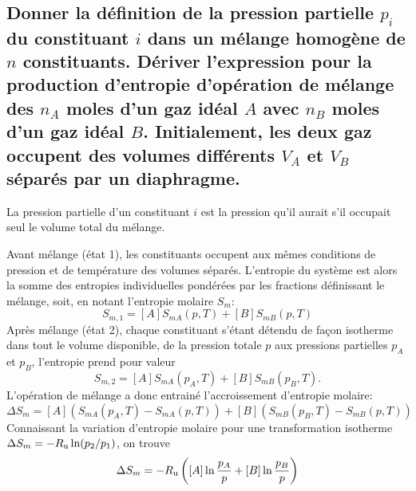 \subsection{Donner la définition de la pression partielle $p_i$ du constituant $i$
dans un mélange homogène de $n$ constituants.
Dériver l'expression pour la production d'entropie d'opération de mélange des
$n_A$ moles d'un gaz idéal $A$ avec $n_B$ moles d'un gaz idéal $B$.
Initialement, les deux gaz occupent des volumes différents $V_A$ et $V_B$
séparés par un diaphragme.}
La pression partielle d'un constituant $i$ est la pression qu'il aurait s'il occupait seul le volume total du mélange.

Avant mélange (état 1), les constituants occupent aux mêmes conditions de pression
et de température des volumes séparés.
L'entropie du système est alors la somme des entropies individuelles pondérées par les fractions
définissant le mélange, soit, en notant l'entropie molaire $S_m$:
\[ S_{m,1} = [A] S_{mA}(p,T) + [B] S_{mB}(p,T) \]
Après mélange (état 2), chaque constituant s'étant détendu de façon isotherme dans tout
le volume disponible, de la pression totale $p$ aux pressions partielles $p_A$ et $p_B$,
l'entropie prend pour valeur
\[ S_{m,2} = [A] S_{mA}(p_A,T) + [B] S_{mB}(p_B,T). \]
L'opération de mélange a donc entrainé l'accroissement d'entropie molaire:
\[ \Delta S_m = [A] \left(S_{mA}(p_A,T) - S_{mA}(p,T)\right) +
[B] \left(S_{mB}(p_B,T) - S_{mB}(p,T)\right) \]
Connaissant la variation d'entropie molaire pour une transformation isotherme
$ \Delta S_m = -R_{\mathrm{u}}\ln(p_2/p_1) $, on trouve
\[ \Delta S_m = -R_{\mathrm{u}} \left( [A]\ln\frac{p_A}{p} + [B]\ln\frac{p_B}{p} \right) \]

